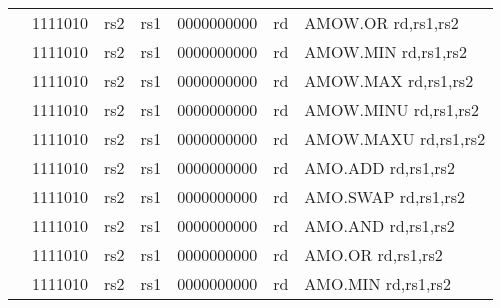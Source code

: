 \begin{table}[p]
\begin{small}
\begin{center}
\begin{tabular}{rcccccccccccl}
&
\multicolumn{2}{|c|}{1111010} &
\multicolumn{1}{c|}{rs2} &
\multicolumn{1}{c|}{rs1} &
\multicolumn{6}{c|}{0000000000} &
\multicolumn{1}{c|}{rd} & AMOW.OR rd,rs1,rs2 \\
\cline{2-12}
  

&
\multicolumn{2}{|c|}{1111010} &
\multicolumn{1}{c|}{rs2} &
\multicolumn{1}{c|}{rs1} &
\multicolumn{6}{c|}{0000000000} &
\multicolumn{1}{c|}{rd} & AMOW.MIN rd,rs1,rs2 \\
\cline{2-12}
  

&
\multicolumn{2}{|c|}{1111010} &
\multicolumn{1}{c|}{rs2} &
\multicolumn{1}{c|}{rs1} &
\multicolumn{6}{c|}{0000000000} &
\multicolumn{1}{c|}{rd} & AMOW.MAX rd,rs1,rs2 \\
\cline{2-12}
  

&
\multicolumn{2}{|c|}{1111010} &
\multicolumn{1}{c|}{rs2} &
\multicolumn{1}{c|}{rs1} &
\multicolumn{6}{c|}{0000000000} &
\multicolumn{1}{c|}{rd} & AMOW.MINU rd,rs1,rs2 \\
\cline{2-12}
  

&
\multicolumn{2}{|c|}{1111010} &
\multicolumn{1}{c|}{rs2} &
\multicolumn{1}{c|}{rs1} &
\multicolumn{6}{c|}{0000000000} &
\multicolumn{1}{c|}{rd} & AMOW.MAXU rd,rs1,rs2 \\
\cline{2-12}
  

&
\multicolumn{2}{|c|}{1111010} &
\multicolumn{1}{c|}{rs2} &
\multicolumn{1}{c|}{rs1} &
\multicolumn{6}{c|}{0000000000} &
\multicolumn{1}{c|}{rd} & AMO.ADD rd,rs1,rs2 \\
\cline{2-12}
  

&
\multicolumn{2}{|c|}{1111010} &
\multicolumn{1}{c|}{rs2} &
\multicolumn{1}{c|}{rs1} &
\multicolumn{6}{c|}{0000000000} &
\multicolumn{1}{c|}{rd} & AMO.SWAP rd,rs1,rs2 \\
\cline{2-12}
  

&
\multicolumn{2}{|c|}{1111010} &
\multicolumn{1}{c|}{rs2} &
\multicolumn{1}{c|}{rs1} &
\multicolumn{6}{c|}{0000000000} &
\multicolumn{1}{c|}{rd} & AMO.AND rd,rs1,rs2 \\
\cline{2-12}
  

&
\multicolumn{2}{|c|}{1111010} &
\multicolumn{1}{c|}{rs2} &
\multicolumn{1}{c|}{rs1} &
\multicolumn{6}{c|}{0000000000} &
\multicolumn{1}{c|}{rd} & AMO.OR rd,rs1,rs2 \\
\cline{2-12}
  

&
\multicolumn{2}{|c|}{1111010} &
\multicolumn{1}{c|}{rs2} &
\multicolumn{1}{c|}{rs1} &
\multicolumn{6}{c|}{0000000000} &
\multicolumn{1}{c|}{rd} & AMO.MIN rd,rs1,rs2 \\
\cline{2-12}
  


\end{tabular}
\end{center}
\end{small}
\end{table}
